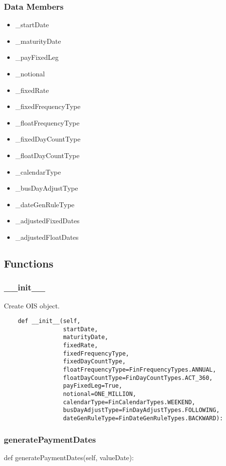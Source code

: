 \documentclass[twoside,11pt]{book}
\begin{document}
\subsubsection*{Data Members}
\begin{itemize}
\item{\_startDate}
\item{\_maturityDate}
\item{\_payFixedLeg}
\item{\_notional}
\item{\_fixedRate}
\item{\_fixedFrequencyType}
\item{\_floatFrequencyType}
\item{\_fixedDayCountType}
\item{\_floatDayCountType}
\item{\_calendarType}
\item{\_busDayAdjustType}
\item{\_dateGenRuleType}
\item{\_adjustedFixedDates}
\item{\_adjustedFloatDates}
\end{itemize}

\subsection*{Functions}

\subsubsection*{{\bf \_\_init\_\_}}
Create OIS object.  

\begin{lstlisting}
    def __init__(self,
                 startDate,
                 maturityDate,
                 fixedRate,
                 fixedFrequencyType,
                 fixedDayCountType,
                 floatFrequencyType=FinFrequencyTypes.ANNUAL,
                 floatDayCountType=FinDayCountTypes.ACT_360,
                 payFixedLeg=True,
                 notional=ONE_MILLION,
                 calendarType=FinCalendarTypes.WEEKEND,
                 busDayAdjustType=FinDayAdjustTypes.FOLLOWING,
                 dateGenRuleType=FinDateGenRuleTypes.BACKWARD):
\end{lstlisting}

\subsubsection*{{\bf generatePaymentDates}}
def generatePaymentDates(self, valueDate): 
\end{document}

